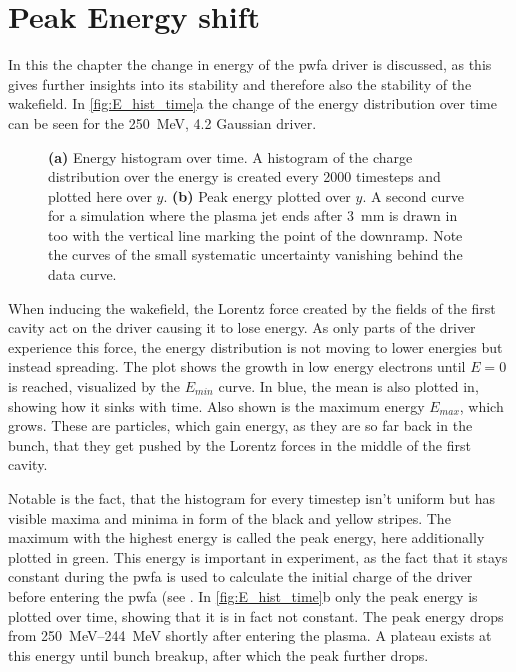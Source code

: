 \documentclass[bachelor_thesis]{subfiles}
\begin{document}
\section{Peak Energy shift} \label{chap:E_shift}
In this the chapter the change in energy of the \gls{pwfa} driver is discussed, as this gives further insights into its stability and therefore also the stability of the wakefield.
In \autoref{fig:E_hist_time}a the change of the energy distribution over time can be seen for the \qty{250}{\MeV}, \qty{4.2}{\mrad} Gaussian driver.
\begin{figure}
	\centering
	
	\caption{
	\textbf{(a)} Energy histogram over time. A histogram of the charge distribution over the energy is created every 2000 timesteps and plotted here over $y$.
	\textbf{(b)} Peak energy plotted over $y$. A second curve for a simulation where the plasma jet ends after \qty{3}{\mm} is drawn in too with the vertical line marking the point of the downramp. Note the curves of the small systematic uncertainty vanishing behind the data curve.}
	\label{fig:E_hist_time}
\end{figure}
When inducing the wakefield, the Lorentz force created by the fields of the first cavity act on the driver causing it to lose energy. As only parts of the driver experience this force, the energy distribution is not moving to lower energies but instead spreading.
The plot shows the growth in low energy electrons until $E=0$ is reached, visualized by the $E_{min}$ curve. In blue, the mean is also plotted in, showing how it sinks with time. Also shown is the maximum energy $E_{max}$, which grows.
These are particles, which gain energy, as they are so far back in the bunch, that they get pushed by the Lorentz forces in the middle of the first cavity.

Notable is the fact, that the histogram for every timestep isn't uniform but has visible maxima and minima in form of the black and yellow stripes. The maximum with the highest energy is called the peak energy, here additionally plotted in green.
This energy is important in experiment, as the fact that it stays constant during the \gls{pwfa} is used to calculate the initial charge of the driver before entering the \gls{pwfa} (see \cite{Schoebel2022}.
In \autoref{fig:E_hist_time}b only the peak energy is plotted over time, showing that it is in fact not constant. The peak energy drops from \qtyrange{250}{244}{\MeV} shortly after entering the plasma.
A plateau exists at this energy until bunch breakup, after which the peak further drops.
\end{document}
